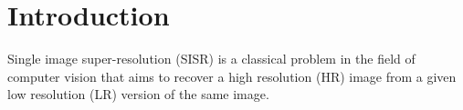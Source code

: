 \section{Introduction}

Single image super-resolution (SISR) is a classical problem in the field of computer vision that aims to recover a high resolution (HR) image from a given low resolution (LR) version of the same image. 



\lipsum[1] \cite{pSRCNN} \cite{SRCNN} \cite{FSRCNN} \cite{IRCNN}
